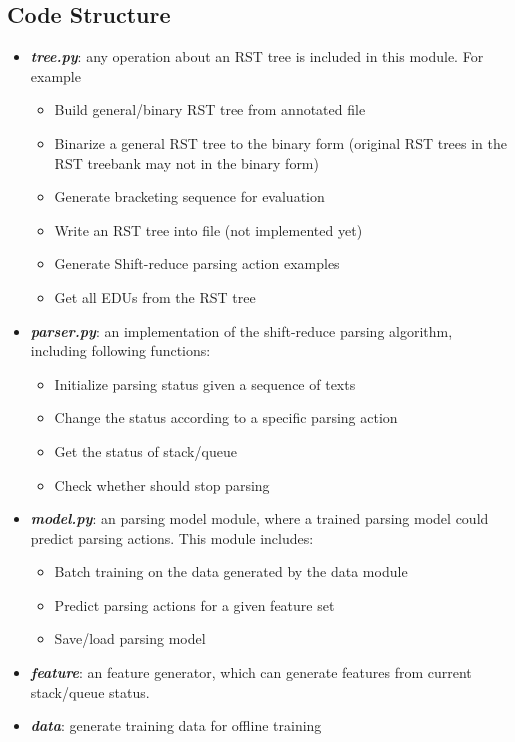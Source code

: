 \documentclass[12pt]{article}
\newcommand{\codefile}[1]{\textbf{\textit{#1}}}
\begin{document}
\subsection{Code Structure}
\begin{itemize}
\item \codefile{tree.py}: any operation about an RST tree is included in this module. For example
  \begin{itemize}
  \item Build general/binary RST tree from annotated file
  \item Binarize a general RST tree to the binary form (original RST trees in the RST treebank may not in the binary form)
  \item Generate bracketing sequence for evaluation
  \item Write an RST tree into file (not implemented yet)
  \item Generate Shift-reduce parsing action examples
  \item Get all EDUs from the RST tree
  \end{itemize}
\item \codefile{parser.py}: an implementation of the shift-reduce parsing algorithm, including following functions:
  \begin{itemize}
  \item Initialize parsing status given a sequence of texts
  \item Change the status according to a specific parsing action
  \item Get the status of stack/queue
  \item Check whether should stop parsing
  \end{itemize}
\item \codefile{model.py}: an parsing model module, where a trained parsing model could predict parsing actions. This module includes:
  \begin{itemize}
  \item Batch training on the data generated by the data module
  \item Predict parsing actions for a given feature set
  \item Save/load parsing model
  \end{itemize}
\item \codefile{feature}: an feature generator, which can generate features from current stack/queue status.
\item \codefile{data}: generate training data for offline training
\end{itemize}
\end{document}

